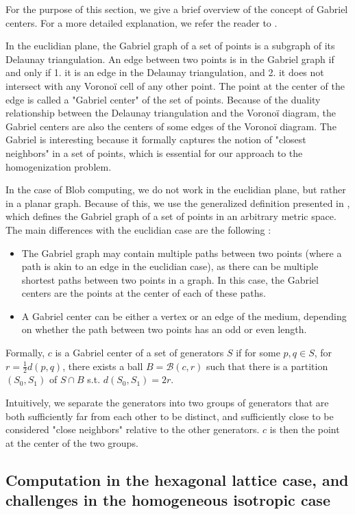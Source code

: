 \documentclass[11pt,a4paper]{report}
\begin{document}
For the purpose of this section, we give a brief overview of the concept of Gabriel centers. For a more detailed explanation, we refer the reader to \cite{gabrielcenters}.

In the euclidian plane, the Gabriel graph of a set of points is a subgraph of its Delaunay triangulation. An edge between two points is in the Gabriel graph if and only if 1. it is an edge in the Delaunay triangulation, and 2. it does not intersect with any Voronoï cell of any other point. The point at the center of the edge is called a "Gabriel center" of the set of points. Because of the duality relationship between the Delaunay triangulation and the Voronoï diagram, the Gabriel centers are also the centers of some edges of the Voronoï diagram. The Gabriel is interesting because it formally captures the notion of "closest neighbors" in a set of points, which is essential for our approach to the homogenization problem.

In the case of Blob computing, we do not work in the euclidian plane, but rather in a planar graph. Because of this, we use the generalized definition presented in \cite{gabrielcenters}, which defines the Gabriel graph of a set of points in an arbitrary metric space. The main differences with the euclidian case are the following :
\begin{itemize}
    \item The Gabriel graph may contain multiple paths between two points (where a path is akin to an edge in the euclidian case), as there can be multiple shortest paths between two points in a graph. In this case, the Gabriel centers are the points at the center of each of these paths.
    \item A Gabriel center can be either a vertex or an edge of the medium, depending on whether the path between two points has an odd or even length.
\end{itemize}

Formally, $c$ is a Gabriel center of a set of generators $S$ if for some $p, q \in S$, for $r = \frac{1}{2}d(p, q)$, there exists a ball $B = \mathcal{B}(c, r)$ such that there is a partition $(S_0, S_1)$ of $S \cap B$ s.t. $d(S_0, S_1) = 2r$.

Intuitively, we separate the generators into two groups of generators that are both sufficiently far from each other to be distinct, and sufficiently close to be considered "close neighbors" relative to the other generators. $c$ is then the point at the center of the two groups.

\subsection{Computation in the hexagonal lattice case, and challenges in the homogeneous isotropic case}
\end{document}
